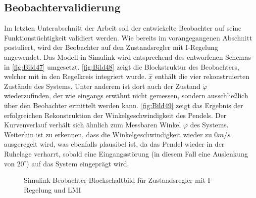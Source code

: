 \subsection{Beobachtervalidierung}

Im letzten Unterabschnitt der Arbeit soll der entwickelte Beobachter auf seine Funktionstüchtigkeit validiert werden. Wie bereits im vorangegangenen Abschnitt postuliert, wird der Beobachter auf den Zustandsregler mit I-Regelung angewendet. Das Modell in Simulink wird entsprechend des entworfenen Schemas in \autoref{fig:Bild47} umgesetzt. \autoref{fig:Bild48} zeigt die Blockstruktur des Beobachters, welcher mit in den Regelkreis integriert wurde. $\underline{\hat{x}}$ enthält die vier rekonstruierten Zustände des Systems. Unter anderem ist dort auch der Zustand $\dot{\varphi}$ wiederzufinden, der wie eingangs erwähnt nicht gemessen, sondern ausschließlich über den Beobachter ermittelt werden kann. \autoref{fig:Bild49} zeigt das Ergebnis der erfolgreichen Rekonstruktion der Winkelgeschwindigkeit des Pendels. Der Kurvenverlauf verhält sich ähnlich zum Messbaren Winkel $\varphi$ des Systems. Weiterhin ist zu erkennen, dass die Winkelgeschwindigkeit wieder zu $0 m/s$ ausgeregelt wird, was ebenfalls plausibel ist, da das Pendel wieder in der Ruhelage verharrt, sobald eine Eingangsstörung (in diesem Fall eine Auslenkung von $20^\circ$) auf das System eingeprägt wird.

\begin{figure}[H]
    \centering
    \caption[Beobachter Simulink]{Simulink Beobachter-Blockschaltbild für Zustandsregler mit I-Regelung und LMI}
    \label{fig:Bild48}
\end{figure}


